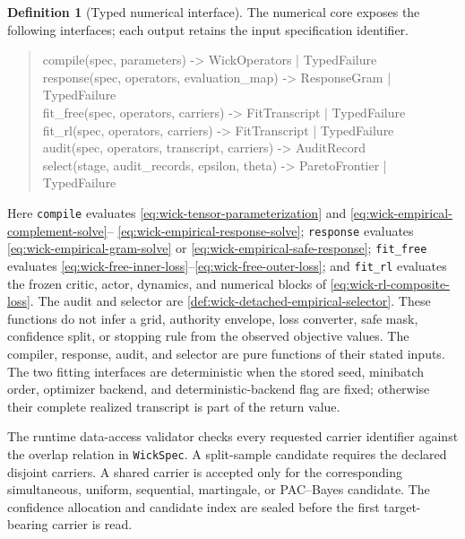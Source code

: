 \documentclass[11pt]{article}
\numberwithin{section}{part}
\theoremstyle{plain}
\theoremstyle{definition}
\newtheorem{definition}[definition]{Definition}
\theoremstyle{remark}
\begin{document}
\begin{definition}[Typed numerical interface]
\label{def:wick-pure-numerical-interface}
The numerical core exposes the following interfaces; each output retains the
input specification identifier.
\begin{quote}
\small\ttfamily
compile(spec, parameters) -> WickOperators | TypedFailure\\
response(spec, operators, evaluation\_map) -> ResponseGram | TypedFailure\\
fit\_free(spec, operators, carriers) -> FitTranscript | TypedFailure\\
fit\_rl(spec, operators, carriers) -> FitTranscript | TypedFailure\\
audit(spec, operators, transcript, carriers) -> AuditRecord\\
select(stage, audit\_records, epsilon, theta) -> ParetoFrontier | TypedFailure
\end{quote}
Here \texttt{compile} evaluates
\eqref{eq:wick-tensor-parameterization} and
\eqref{eq:wick-empirical-complement-solve}--
\eqref{eq:wick-empirical-response-solve}; \texttt{response} evaluates
\eqref{eq:wick-empirical-gram-solve} or
\eqref{eq:wick-empirical-safe-response}; \texttt{fit\_free} evaluates
\eqref{eq:wick-free-inner-loss}--\eqref{eq:wick-free-outer-loss}; and
\texttt{fit\_rl} evaluates the frozen critic, actor, dynamics, and numerical
blocks of \eqref{eq:wick-rl-composite-loss}.  The audit and selector are
\cref{def:wick-detached-empirical-selector}.  These functions do not infer a
grid, authority envelope, loss converter, safe mask, confidence split, or
stopping rule from the observed objective values.
The compiler, response, audit, and selector are pure functions of their stated
inputs.  The two fitting interfaces are deterministic when the stored seed,
minibatch order, optimizer backend, and deterministic-backend flag are fixed;
otherwise their complete realized transcript is part of the return value.

The runtime data-access validator checks every requested carrier identifier
against the overlap relation in \texttt{WickSpec}.  A split-sample candidate
requires the declared disjoint carriers.  A shared carrier is accepted only
for the corresponding simultaneous, uniform, sequential, martingale, or
PAC--Bayes candidate.  The confidence allocation and candidate index are
sealed before the first target-bearing carrier is read.
\end{definition}
\end{document}
